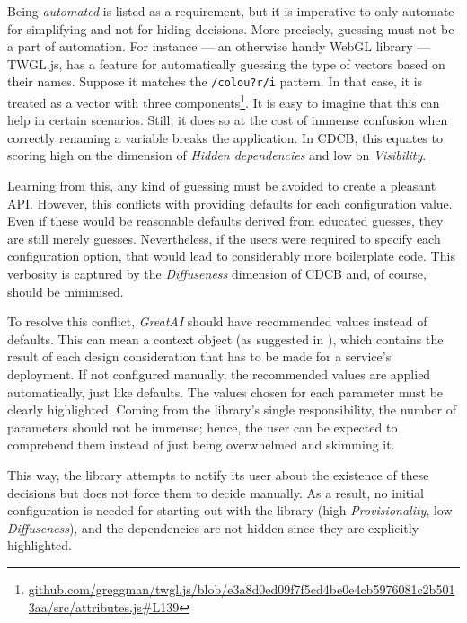 Being \textit{automated} is listed as a requirement, but it is imperative to only automate for simplifying and not for hiding decisions. More precisely, guessing must not be a part of automation. For instance --- an otherwise handy WebGL library --- TWGL.js, has a feature for automatically guessing the type of vectors based on their names. Suppose it matches the \texttt{/colou?r/i} pattern. In that case, it is treated as a vector with three components\footnote{\href{https://github.com/greggman/twgl.js/blob/e3a8d0ed09f7f5cd4be0e4cb5976081c2b5013aa/src/attributes.js\#L139}{\tiny github.com/greggman/twgl.js/blob/e3a8d0ed09f7f5cd4be0e4cb5976081c2b5013aa/src/attributes.js\#L139}}. It is easy to imagine that this can help in certain scenarios. Still, it does so at the cost of immense confusion when correctly renaming a variable breaks the application. In CDCB, this equates to scoring high on the dimension of \textit{Hidden dependencies} and low on \textit{Visibility}.

Learning from this, any kind of guessing must be avoided to create a pleasant API. However, this conflicts with providing defaults for each configuration value. Even if these would be reasonable defaults derived from educated guesses, they are still merely guesses. Nevertheless, if the users were required to specify each configuration option, that would lead to considerably more boilerplate code. This verbosity is captured by the \textit{Diffuseness} dimension of CDCB and, of course, should be minimised.

To resolve this conflict, \textit{GreatAI} should have recommended values instead of defaults. This can mean a context object (as suggested in \cite{ousterhout2018philosophy}), which contains the result of each design consideration that has to be made for a service's deployment. If not configured manually, the recommended values are applied automatically, just like defaults. The values chosen for each parameter must be clearly highlighted. Coming from the library's single responsibility, the number of parameters should not be immense; hence, the user can be expected to comprehend them instead of just being overwhelmed and skimming it.

This way, the library attempts to notify its user about the existence of these decisions but does not force them to decide manually. As a result, no initial configuration is needed for starting out with the library (high \textit{Provisionality}, low \textit{Diffuseness}), and the dependencies are not hidden since they are explicitly highlighted.

